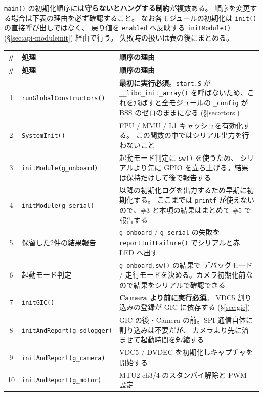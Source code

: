 \documentclass[a4paper,11pt,dvipdfmx]{jsarticle}
\begin{document}
\texttt{main()} の初期化順序には\textbf{守らないとハングする制約}が複数ある。
順序を変更する場合は下表の理由を必ず確認すること。
なお各モジュールの初期化は \texttt{init()} の直接呼び出しではなく、
戻り値を \texttt{enabled} へ反映する \texttt{initModule()}
(\hyperref[sec:api-moduleinit]{§\ref*{sec:api-moduleinit}}) 経由で行う。
失敗時の扱いは表の後にまとめる。

\begin{longtable}{c l p{78mm}}
\toprule
\textbf{\#} & \textbf{処理} & \textbf{順序の理由} \\
\midrule
\endfirsthead
\toprule
\textbf{\#} & \textbf{処理} & \textbf{順序の理由} \\
\midrule
\endhead
1  & \texttt{runGlobalConstructors()} & \textbf{最初に実行必須}。\texttt{start.S} が
     \texttt{\_\_libc\_init\_array()} を呼ばないため、これを飛ばすと全モジュールの
     \texttt{\_config} が BSS のゼロのままになる (\hyperref[sec:ctors]{§\ref*{sec:ctors}}) \\
2  & \texttt{SystemInit()}      & FPU / MMU / L1 キャッシュを有効化する。
     この関数の中ではシリアル出力を行わないこと \\
3  & \texttt{initModule(g\_onboard)} & 起動モード判定に \texttt{sw()} を使うため、
     シリアルより先に GPIO を立ち上げる。結果は保持だけして後で報告する \\
4  & \texttt{initModule(g\_serial)}  & 以降の初期化ログを出力するため早期に初期化する。
     ここまでは \texttt{printf} が使えないので、\#3 と本項の結果はまとめて \#5 で報告する \\
5  & 保留した2件の結果報告      & \texttt{g\_onboard} / \texttt{g\_serial} の失敗を
     \texttt{reportInitFailure()} でシリアルと赤 LED へ出す \\
6  & 起動モード判定             & \texttt{g\_onboard.sw()} の結果で
     デバッグモード / 走行モードを決める。カメラ初期化前なので結果をシリアルで確認できる \\
7  & \texttt{initGIC()}         & \textbf{Camera より前に実行必須}。
     VDC5 割り込みの登録が GIC に依存する (\hyperref[sec:gic]{§\ref*{sec:gic}}) \\
8  & \texttt{initAndReport(g\_sdlogger)} & GIC の後・Camera の前。SPI 通信自体に割り込みは不要だが、
     カメラより先に済ませて起動時間を短縮する \\
9  & \texttt{initAndReport(g\_camera)}   & VDC5 / DVDEC を初期化しキャプチャを開始する \\
10 & \texttt{initAndReport(g\_motor)}    & MTU2 ch3/4 のスタンバイ解除と PWM 設定 \\

\end{longtable}
\end{document}
